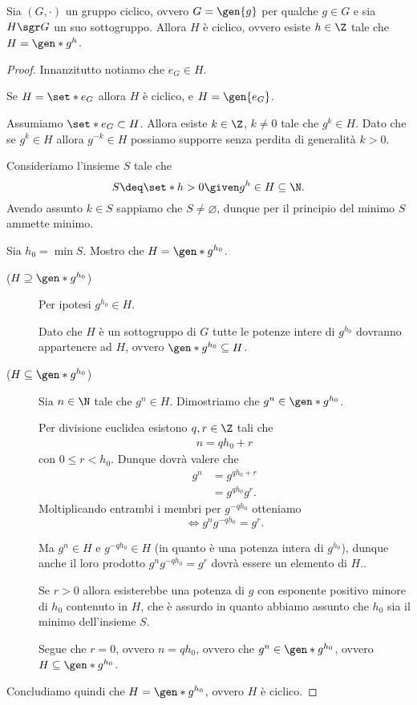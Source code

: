 \begin{theorem}
     \label{th:sottogr_ciclico}
    Sia $(G, \cdot)$ un gruppo ciclico, ovvero $G = \gen{g}$ per qualche $g \in G$ e sia $H \sgr G$ un suo sottogruppo.
    Allora $H$ è ciclico, ovvero esiste $h \in \Z$ tale che $H = \gen*{g^h}$.
\end{theorem}
\begin{proof}
    Innanzitutto notiamo che $e_G \in H$. 
    
    Se $H = \set*{e_G}$ allora $H$ è ciclico, e $H = \gen{e_G}$.

    Assumiamo $\set*{e_G} \subset H$. Allora esiste $k \in \Z$, $k \neq 0$ tale che $g^k \in H$. 
    Dato che se $g^k \in H$ allora $g^{-k} \in H$ possiamo supporre senza perdita di generalità $k > 0$.

    Consideriamo l'insieme $S$ tale che \[
        S \deq \set*{h > 0 \given g^h \in H} \subseteq \N.    
    \] Avendo assunto $k \in S$ sappiamo che $S \neq \varnothing$, dunque per il principio del minimo $S$ ammette minimo.

    Sia $h_0 = \min S$. Mostro che $H = \gen*{g^{h_0}}$.
    \begin{description}
        \item[($H \supseteq \gen*{g^{h_0}}$)] Per ipotesi $g^{h_0} \in H$. 
        
        Dato che $H$ è un sottogruppo di $G$ tutte le potenze intere di $g^{h_0}$ dovranno appartenere ad $H$, ovvero $\gen*{g^{h_0}} \subseteq H$.
        \item[($H \subseteq \gen*{g^{h_0}}$)] Sia $n \in \N$ tale che $g^n \in H$. Dimostriamo che $g^n \in \gen*{g^{h_0}}$.
        
        Per divisione euclidea esistono $q, r \in \Z$ tali che \begin{align*}
            n = qh_0 + r
        \end{align*} con $0 \leq r < h_0$.
        Dunque dovrà valere che\begin{align*}
            g^n &= g^{qh_0 + r}\\
                &= g^{qh_0}g^r.
        \end{align*}
        Moltiplicando entrambi i membri per $g^{-qh_0}$ otteniamo \[
            \iff g^ng^{-qh_0} = g^r.
        \]

        Ma $g^n \in H$ e $g^{-qh_0} \in H$ (in quanto è una potenza intera di $g^{h_0}$), dunque anche il loro prodotto $g^ng^{-qh_0} = g^r$ dovrà essere un elemento di $H$..

        Se $r > 0$ allora esisterebbe una potenza di $g$ con esponente positivo minore di $h_0$ contenuto in $H$, che è assurdo in quanto abbiamo assunto che $h_0$ sia il minimo dell'insieme $S$.
        
        Segue che $r = 0$, ovvero $n = qh_0$, ovvero che $g^n \in \gen*{g^{h_0}}$, ovvero $H \subseteq \gen*{g^{h_0}}$.
    \end{description}

    Concludiamo quindi che $H = \gen*{g^{h_0}}$, ovvero $H$ è ciclico.
\end{proof}

